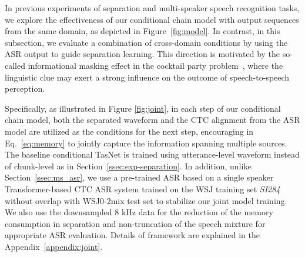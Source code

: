 \documentclass{article}
\begin{document}
\begin{table}[tb]
\centering
\vspace{-0.2cm}
\caption{SI-SNRi (dB) and WER (\%) for multi-speaker joint training on WSJ0-mix-\textbf{8 kHz} dataset.}
\label{table:exp-joint}
\vspace{-0.4cm}
\end{table}
In previous experiments of separation and multi-speaker speech recognition tasks, we explore the effectiveness of our conditional chain model with output sequences from the same domain, as depicted in Figure~\ref{fig:model}. 
In contrast, in this subsection, we evaluate a combination of cross-domain conditions by using the ASR output to guide separation learning.
This direction is motivated by the so-called informational masking effect in the cocktail party problem~\cite{brungart2001informational,kidd2017informational}, where the linguistic clue may exert a strong influence on the outcome of speech-to-speech perception.

Specifically, as illustrated in Figure \ref{fig:joint}, in each step of our conditional chain model, both the separated waveform and the CTC alignment from the ASR model are utilized as the conditions for the next step, encouraging  in Eq.~\ref{eq:memory} to jointly capture the information spanning multiple sources.
The baseline conditional TasNet is trained using utterance-level waveform instead of chunk-level as in Section~\ref{ssec:exp-separation}. 
In addition, unlike Section~\ref{ssec:ms_asr}, we use a pre-trained ASR based on a single speaker Transformer-based CTC ASR system trained on the WSJ training set \textit{SI284} without overlap with WSJ0-2mix test set to stabilize our joint model training.
We also use the downsampled 8 kHz data for the reduction of the memory consumption in separation and non-truncation of the speech mixture for appropriate ASR evaluation. Details of framework are explained in the Appendix~\ref{appendix:joint}.
\end{document}
